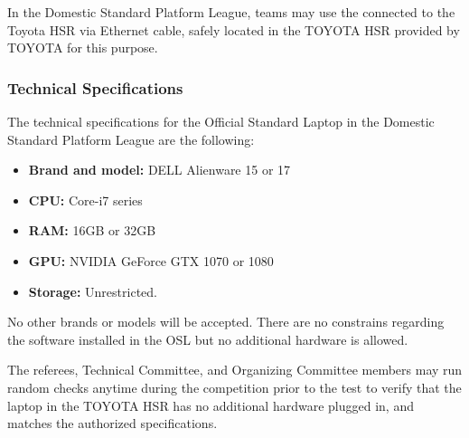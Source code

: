 
% 
% 
In the Domestic Standard Platform League, teams may use the  connected to the Toyota HSR via Ethernet cable, safely located in the TOYOTA HSR  provided by TOYOTA for this purpose.

\subsubsection{Technical Specifications}
The technical specifications for the Official Standard Laptop in the Domestic Standard Platform League are the following:


 \begin{itemize}
  \item \textbf{Brand and model:} DELL Alienware 15 or 17
  \item \textbf{CPU:} Core-i7 series
  \item \textbf{RAM:} 16GB or 32GB
  \item \textbf{GPU:} NVIDIA GeForce GTX 1070 or 1080
  \item \textbf{Storage:} Unrestricted.
\end{itemize}

No other brands or models will be accepted. There are no constrains regarding the software installed in the OSL but no additional hardware is allowed.

The referees, Technical Committee, and Organizing Committee members may run random checks anytime during the competition prior to the test to verify that the laptop in the TOYOTA HSR  has no additional hardware plugged in, and matches the authorized specifications.


